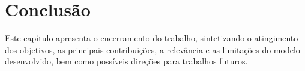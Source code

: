 \chapter{Conclusão}
\label{sec_Conclusao}

Este capítulo apresenta o encerramento do trabalho, sintetizando o atingimento dos objetivos, as principais contribuições, a relevância e as limitações do modelo desenvolvido, bem como possíveis direções para trabalhos futuros.











